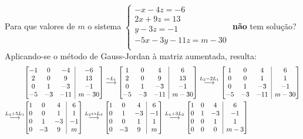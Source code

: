 \documentclass[12pt,a4paper]{article}
\makeatletter
\newenvironment{amatrix}[1]{%
  \left[\begin{array}{@{}*{#1}{c}|c@{}}
}{%
  \end{array}\right]
}
\newcommand{\grstep}[2][\relax]{%
   \ensuremath{\mathrel{
       {\mathop{\longrightarrow}\limits^{#2\mathstrut}_{
                                     \begin{subarray}{l} #1 \end{subarray}}}}}}
\newcommand{\swap}{\leftrightarrow}
\makeatother
\begin{document}
\begin{ExerciseList}
\Exercise[title={1,8}] Para que valores de $m$ o sistema $\begin{cases}
 -x    -4z =-6 \\
 2x    +9z =13 \\
     y -3z =-1 \\
-5x-3y-11z =m-30 \\
\end{cases}$ \textbf{não} tem solução?
\Answer Aplicando-se o método de Gauss-Jordan à matriz aumentada, resulta:
\begin{align*}
&
\begin{amatrix}{3}
-1 &  0 & -4  & -6 \\
 2 &  0 &  9  & 13 \\
 0 &  1 & -3  & -1 \\
-5 & -3 & -11 & m-30
\end{amatrix}
\grstep{ -L_1 }
\begin{amatrix}{3}
 1 &  0 &  4  &  6 \\
 2 &  0 &  9  & 13 \\
 0 &  1 & -3  & -1 \\
-5 & -3 & -11 & m-30
\end{amatrix}
\grstep{ L_2 - 2 L_1 }
\begin{amatrix}{3}
 1 &  0 &   4 &  6 \\
 0 &  0 &   1 &  1 \\
 0 &  1 &  -3 & -1 \\
-5 & -3 & -11 & m-30
\end{amatrix}\\
\grstep{ L_4 +5 L_1 }
&
\begin{amatrix}{3}
1 &  0 &  4 &  6 \\
0 &  0 &  1 &  1 \\
0 &  1 & -3 & -1 \\
0 & -3 &  9 &  m
\end{amatrix}
\grstep{ L_2 \swap L_3 }
\begin{amatrix}{3}
1 &  0 &  4 &  6 \\
0 &  1 & -3 & -1 \\
0 &  0 &  1 &  1 \\
0 & -3 &  9 &  m
\end{amatrix}
\grstep{ L_4 +3 L_2 }
\begin{amatrix}{3}
1 & 0 &  4 &  6 \\
0 & 1 & -3 & -1 \\
0 & 0 &  1 &  1 \\
0 & 0 &  0 &  m-3
\end{amatrix}\\

\end{align*}
\end{ExerciseList}
\end{document}
